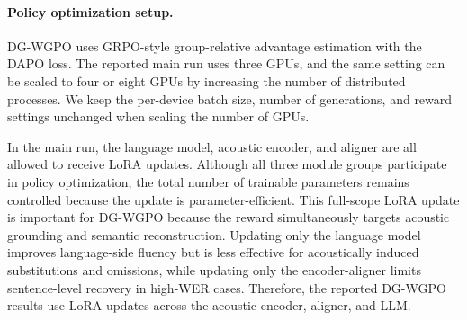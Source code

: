 \documentclass{llmxive}
\begin{document}
\paragraph{Policy optimization setup.}
DG-WGPO uses GRPO-style group-relative advantage estimation with the DAPO loss.
The reported main run uses three GPUs, and the same setting can be scaled to four
or eight GPUs by increasing the number of distributed processes. We keep the
per-device batch size, number of generations, and reward settings unchanged when
scaling the number of GPUs.

In the main run, the language model, acoustic encoder, and aligner are all allowed
to receive LoRA updates. Although all three module groups participate in policy
optimization, the total number of trainable parameters remains controlled because
the update is parameter-efficient. This full-scope LoRA update is important for
DG-WGPO because the reward simultaneously targets acoustic grounding and semantic
reconstruction. Updating only the language model improves language-side fluency
but is less effective for acoustically induced substitutions and omissions, while
updating only the encoder-aligner limits sentence-level recovery in high-WER
cases. Therefore, the reported DG-WGPO results use LoRA updates across the
acoustic encoder, aligner, and LLM.
\end{document}

